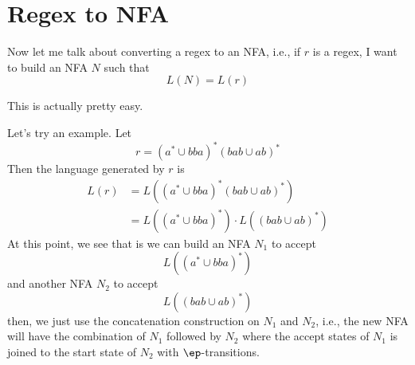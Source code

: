 \section{Regex to NFA}

Now let me talk about converting a regex to an NFA, i.e.,
if $r$ is a regex, I want to build an NFA $N$ such that 
\[
L(N) = L(r)
\]

This is actually pretty easy.

Let's try an example.
Let
\[
r = (a^* \cup bba)^* (bab \cup ab)^*
\]
Then the language generated by $r$ is
\begin{align*}
L(r) 
&= L((a^* \cup bba)^* (bab \cup ab)^*) \\
&= L((a^* \cup bba)^*) \cdot L((bab \cup ab)^*)
\end{align*}
At this point, we see that is we can build an NFA $N_1$ to accept
\[
L((a^* \cup bba)^*)
\]
and another NFA $N_2$ to accept
\[
L((bab \cup ab)^*)
\]
then, we just use the concatenation construction on $N_1$ and $N_2$, i.e.,
the new NFA will have the combination of $N_1$ followed by $N_2$
where the accept states of $N_1$ is joined to the start state
of $N_2$ with $\ep$-transitions.

